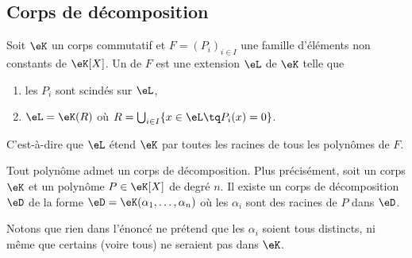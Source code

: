 
\subsection{Corps de décomposition}

\begin{definition}      \label{DEFooEKGZooSkvbum}
	Soit \( \eK\) un corps commutatif et \( F=(P_i)_{i\in I}\) une famille d'éléments non constants de \( \eK[X]\). Un  de \( F\) est une extension \( \eL\) de \( \eK\) telle que
	\begin{enumerate}
		\item
		      les \( P_i\) sont scindés sur \( \eL\),
		\item
		      \( \eL=\eK(R)\) où \( R=\bigcup_{i\in I}\{ x\in\eL\tq P_i(x)=0 \}\).
	\end{enumerate}
	C'est-à-dire que \( \eL\) étend \( \eK\) par toutes les racines de tous les polynômes de \( F\).
\end{definition}

\begin{proposition}      \label{PROPooDPOYooFHcqkU}
	Tout polynôme admet un corps de décomposition. Plus précisément, soit un corps \( \eK\) et un polynôme \( P\in \eK[X]\) de degré \( n\). Il existe un corps de décomposition \( \eD\) de la forme \( \eD=\eK(\alpha_1,\ldots,\alpha_n)\) où les \( \alpha_i\) sont des racines de \( P\) dans \( \eD\).
\end{proposition}

Notons que rien dans l'énoncé ne prétend que les \( \alpha_i\) soient tous distincts, ni même que certains (voire tous) ne seraient pas dans \( \eK\).

